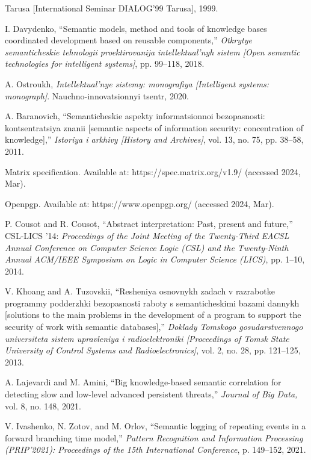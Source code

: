 \documentclass{article}
\begin{document}
\begin{multicols}{2}
\begin{enumerate}[label=\text{[\arabic*]}, noitemsep,topsep=1.5pt,parsep=1.5pt,partopsep=1.5pt]
{Tarusa [International Seminar DIALOG’99 Tarusa]}, 1999.
\item I. Davydenko, “Semantic models, method and tools of knowledge bases coordinated development based on reusable components,” \textit{Otkrytye semanticheskie tehnologii proektirovanija intellektual’nyh sistem [Open semantic technologies for intelligent
systems]}, pp. 99–118, 2018.
\item A. Ostroukh, \textit{Intellektual’nye sistemy: monografiya [Intelligent
systems: monograph]}. Nauchno-innovatsionnyi tsentr, 2020.
\item A. Baranovich, “Semanticheskie aspekty informatsionnoi
bezopasnosti: kontsentratsiya znanii [semantic aspects of
information security: concentration of knowledge],” \textit{Istoriya i
arkhivy [History and Archives]}, vol. 13, no. 75, pp. 38–58, 2011.
\item Matrix specification. Available at: https://spec.matrix.org/v1.9/
(accessed 2024, Mar).
\item Openpgp. Available at: https://www.openpgp.org/ (accessed 2024,
Mar).
\item P. Cousot and R. Cousot, “Abstract interpretation: Past, present
and future,” CSL-LICS ’14: \textit{Proceedings of the Joint Meeting of
the Twenty-Third EACSL Annual Conference on Computer Science
Logic (CSL) and the Twenty-Ninth Annual ACM/IEEE Symposium
on Logic in Computer Science (LICS)}, pp. 1–10, 2014.
\item V. Khoang and A. Tuzovskii, “Resheniya osnovnykh zadach
v razrabotke programmy podderzhki bezopasnosti raboty s
semanticheskimi bazami dannykh [solutions to the main problems
in the development of a program to support the security of work
with semantic databases],” \textit{Doklady Tomskogo gosudarstvennogo
universiteta sistem upravleniya i radioelektroniki [Proceedings of
Tomsk State University of Control Systems and Radioelectronics]},
vol. 2, no. 28, pp. 121–125, 2013.
\item A. Lajevardi and M. Amini, “Big knowledge-based semantic
correlation for detecting slow and low-level advanced persistent
threats,” \textit{Journal of Big Data,} vol. 8, no. 148, 2021.
\item V. Ivashenko, N. Zotov, and M. Orlov, “Semantic logging of
repeating events in a forward branching time model,” \textit{Pattern
Recognition and Information Processing (PRIP’2021): Proceedings of the 15th International Conference}, p. 149–152, 2021.
\end{enumerate}


\end{multicols}
\end{document}
